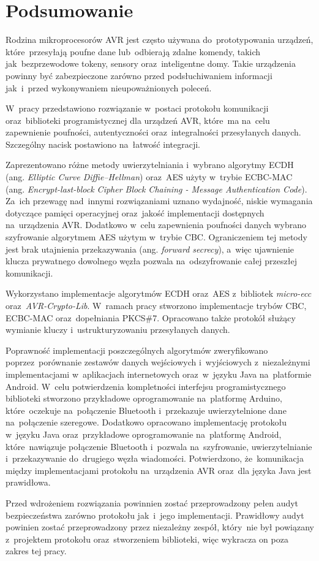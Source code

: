 \chapter*{Podsumowanie}
\label{cha:podsumowanie}

Rodzina mikroprocesorów AVR jest często używana do~prototypowania urządzeń, które~przesyłają poufne dane lub~odbierają zdalne komendy, takich jak~bezprzewodowe tokeny, sensory oraz~inteligentne domy. Takie urządzenia powinny być zabezpieczone zarówno przed podsłuchiwaniem informacji jak~i~przed wykonywaniem nieupoważnionych poleceń.

W~pracy przedstawiono rozwiązanie w~postaci protokołu komunikacji oraz~biblioteki programistycznej dla urządzeń AVR, które~ma na~celu zapewnienie poufności, autentyczności oraz~integralności przesyłanych danych. Szczególny nacisk postawiono na~łatwość integracji.

Zaprezentowano różne metody uwierzytelniania i~wybrano algorytmy ECDH (ang. \emph{Elliptic Curve Diffie--Hellman}) oraz~AES użyty w~trybie ECBC-MAC (ang. \emph{Encrypt-last-block Cipher Block Chaining - Message Authentication Code}). Za~ich przewagę nad~innymi rozwiązaniami uznano wydajność, niskie wymagania dotyczące pamięci operacyjnej oraz~jakość implementacji dostępnych na~urządzenia AVR. Dodatkowo w~celu zapewnienia poufności danych wybrano szyfrowanie algorytmem AES użytym w~trybie CBC. Ograniczeniem tej metody jest brak utajnienia przekazywania (ang. \emph{forward secrecy}), a~więc ujawnienie klucza prywatnego dowolnego węzła pozwala na~odszyfrowanie całej przeszłej komunikacji.

Wykorzystano implementacje algorytmów ECDH oraz~AES z~bibliotek \emph{micro-ecc} oraz~\emph{AVR-Crypto-Lib}. W~ramach pracy stworzono implementacje trybów CBC, ECBC-MAC oraz~dopełniania PKCS\#7. Opracowano także protokół służący wymianie kluczy i~ustrukturyzowaniu przesyłanych danych.

Poprawność implementacji poszczególnych algorytmów zweryfikowano poprzez~porównanie zestawów danych wejściowych i~wyjściowych z~niezależnymi implementacjami w~aplikacjach internetowych oraz~w~języku Java na~platformie Android. W~celu potwierdzenia kompletności interfejsu programistycznego biblioteki stworzono przykładowe oprogramowanie na~platformę Arduino, które~oczekuje na~połączenie Bluetooth i~przekazuje uwierzytelnione dane na~połączenie szeregowe. Dodatkowo opracowano implementację protokołu w~języku Java oraz~przykładowe oprogramowanie na~platformę Android, które~nawiązuje połączenie Bluetooth i~pozwala na~szyfrowanie, uwierzytelnianie i~przekazywanie do~drugiego węzła wiadomości. Potwierdzono, że~komunikacja między implementacjami protokołu na~urządzenia AVR oraz~dla języka Java jest prawidłowa.

Przed wdrożeniem rozwiązania powinnien zostać przeprowadzony pełen audyt bezpieczeństwa zarówno protokołu jak~i~jego implementacji. Prawidłowy audyt powinien zostać przeprowadzony przez niezależny zespół, który~nie był powiązany z~projektem protokołu oraz~stworzeniem biblioteki, więc wykracza on poza zakres tej pracy.
